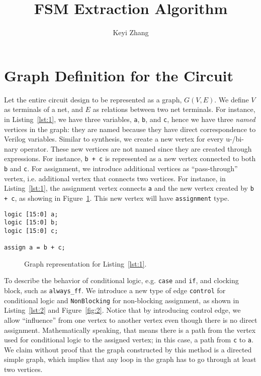 \documentclass{article}
\title{FSM Extraction Algorithm}
\author{Keyi Zhang}
\begin{document}
\maketitle
\section{Graph Definition for the Circuit}\label{sec:1}
Let the entire circuit design to be represented as a graph, $G(V, E)$. We define $V$
as terminals of a net, and $E$ as relations between two net terminals.
For instance, in Listing~\ref{lst:1}, we have three variables, \texttt{a}, \texttt{b},
and \texttt{c}, hence we have three \textit{named} vertices in the graph: they are named
because they have direct correspondence to Verilog variables. Similar to synthesis,
we create a new vertex for every u-/bi-nary operator. These new vertices are not named
since they are created through expressions. For instance, \texttt{b + c} is represented
as a new vertex connected to both \texttt{b} and \texttt{c}.
For assignment, we introduce additional vertices as
``pass-through'' vertex, i.e. additional vertex that connects two vertices. For instance,
in Listing~\ref{lst:1}, the assignment vertex connects \texttt{a} and the new vertex
created by \texttt{b + c}, as showing in Figure~\ref{fig:1}. This new vertex will have
\texttt{assignment} type.
\begin{lstlisting}[style={verilog-style}, caption={Graph example from Verilog},
    label={lst:1}]
logic [15:0] a;
logic [15:0] b;
logic [15:0] c;

assign a = b + c;
\end{lstlisting}

\begin{figure}
    \centering
    \begin{tikzpicture}
    
    \end{tikzpicture}
    \caption{Graph representation for Listing~\ref{lst:1}.}
    \label{fig:1}
\end{figure}

To describe the behavior of conditional logic, e.g. \texttt{case} and \texttt{if}, and
clocking block, such as \texttt{always\_ff}. We introduce a new type of edge \texttt{control}
for conditional logic and \texttt{NonBlocking} for non-blocking assignment, as
shown in Listing~\ref{lst:2} and Figure~\ref{fig:2}. Notice that by introducing
control edge, we allow ``influence'' from one vertex to another vertex
even though there is no direct assignment. Mathematically speaking, that means
there is a path from the vertex used for conditional logic to the assigned vertex; in
this case, a path from \texttt{c} to \texttt{a}. We claim without proof that the graph
constructed by this method is a directed simple graph, which implies that any loop
in the graph has to go through at least two vertices.
\end{document}
